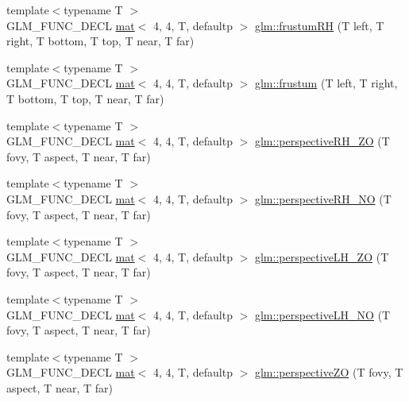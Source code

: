\begin{DoxyCompactItemize}
\item 
{\footnotesize template$<$typename T $>$ }\\G\+L\+M\+\_\+\+F\+U\+N\+C\+\_\+\+D\+E\+CL \hyperlink{structglm_1_1mat}{mat}$<$ 4, 4, T, defaultp $>$ \hyperlink{group__gtc__matrix__transform_ga4366ab45880c6c5f8b3e8c371ca4b136}{glm\+::frustum\+RH} (T left, T right, T bottom, T top, T near, T far)
\item 
{\footnotesize template$<$typename T $>$ }\\G\+L\+M\+\_\+\+F\+U\+N\+C\+\_\+\+D\+E\+CL \hyperlink{structglm_1_1mat}{mat}$<$ 4, 4, T, defaultp $>$ \hyperlink{group__gtc__matrix__transform_ga0bcd4542e0affc63a0b8c08fcb839ea9}{glm\+::frustum} (T left, T right, T bottom, T top, T near, T far)
\item 
{\footnotesize template$<$typename T $>$ }\\G\+L\+M\+\_\+\+F\+U\+N\+C\+\_\+\+D\+E\+CL \hyperlink{structglm_1_1mat}{mat}$<$ 4, 4, T, defaultp $>$ \hyperlink{group__gtc__matrix__transform_ga4da358d6e1b8e5b9ae35d1f3f2dc3b9a}{glm\+::perspective\+R\+H\+\_\+\+ZO} (T fovy, T aspect, T near, T far)
\item 
{\footnotesize template$<$typename T $>$ }\\G\+L\+M\+\_\+\+F\+U\+N\+C\+\_\+\+D\+E\+CL \hyperlink{structglm_1_1mat}{mat}$<$ 4, 4, T, defaultp $>$ \hyperlink{group__gtc__matrix__transform_gad1526cb2cbe796095284e8f34b01c582}{glm\+::perspective\+R\+H\+\_\+\+NO} (T fovy, T aspect, T near, T far)
\item 
{\footnotesize template$<$typename T $>$ }\\G\+L\+M\+\_\+\+F\+U\+N\+C\+\_\+\+D\+E\+CL \hyperlink{structglm_1_1mat}{mat}$<$ 4, 4, T, defaultp $>$ \hyperlink{group__gtc__matrix__transform_gaca32af88c2719005c02817ad1142986c}{glm\+::perspective\+L\+H\+\_\+\+ZO} (T fovy, T aspect, T near, T far)
\item 
{\footnotesize template$<$typename T $>$ }\\G\+L\+M\+\_\+\+F\+U\+N\+C\+\_\+\+D\+E\+CL \hyperlink{structglm_1_1mat}{mat}$<$ 4, 4, T, defaultp $>$ \hyperlink{group__gtc__matrix__transform_gaead4d049d1feab463b700b5641aa590e}{glm\+::perspective\+L\+H\+\_\+\+NO} (T fovy, T aspect, T near, T far)
\item 
{\footnotesize template$<$typename T $>$ }\\G\+L\+M\+\_\+\+F\+U\+N\+C\+\_\+\+D\+E\+CL \hyperlink{structglm_1_1mat}{mat}$<$ 4, 4, T, defaultp $>$ \hyperlink{group__gtc__matrix__transform_gaa9dfba5c2322da54f72b1eb7c7c11b47}{glm\+::perspective\+ZO} (T fovy, T aspect, T near, T far)

\end{DoxyCompactItemize}
